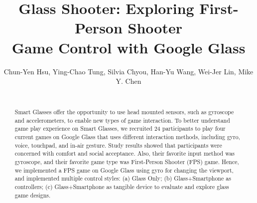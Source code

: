 \documentclass{sigchi}
\begin{document}
\title{Glass Shooter: Exploring First-Person Shooter\\ Game Control with Google Glass}

\author{\alignauthor Chun-Yen Hsu, Ying-Chao Tung, Silvia Chyou, Han-Yu Wang, Wei-Jer Lin, Mike Y. Chen \\
 \\ 
}



\maketitle



\begin{abstract}
Smart Glasses offer the opportunity to use head mounted sensors, such as gyroscope and accelerometers, to enable new types of game interaction. To better understand game play experience on Smart Glasses, we recruited 24 participants to play four current games on Google Glass that uses different interaction methods, including gyro, voice, touchpad, and in-air gesture. Study results showed that participants were concerned with comfort and social acceptance. Also, their favorite input method was gyroscope, and their favorite game type was First-Person Shooter (FPS) game. Hence, we implemented a FPS game on Google Glass using gyro for changing the viewport, and implemented multiple control styles: (a) Glass Only; (b) Glass+Smartphone as controllers; (c) Glass+Smartphone as tangible device to evaluate and explore glass game designs.
\end{abstract}
\end{document}
